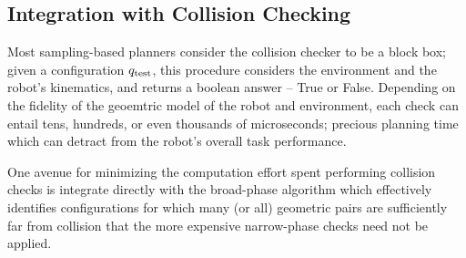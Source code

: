 %
%
%
%

\subsection{Integration with Collision Checking}

Most sampling-based planners consider the collision checker
to be a block box;
given a configuration $q_{\mbox{\scriptsize test}}$,
this procedure considers the environment
and the robot's kinematics,
and returns a boolean answer -- True or False.
Depending on the fidelity of the geoemtric model of the robot
and environment,
each check can entail tens, hundreds, or even thousands
of microseconds;
precious planning time which can detract from the robot's overall
task performance.

One avenue for minimizing the computation effort spent performing
collision checks is integrate directly with the broad-phase
algorithm which effectively identifies configurations for which
many (or all) geometric pairs are sufficiently far from collision
that the more expensive narrow-phase checks need not be applied.

